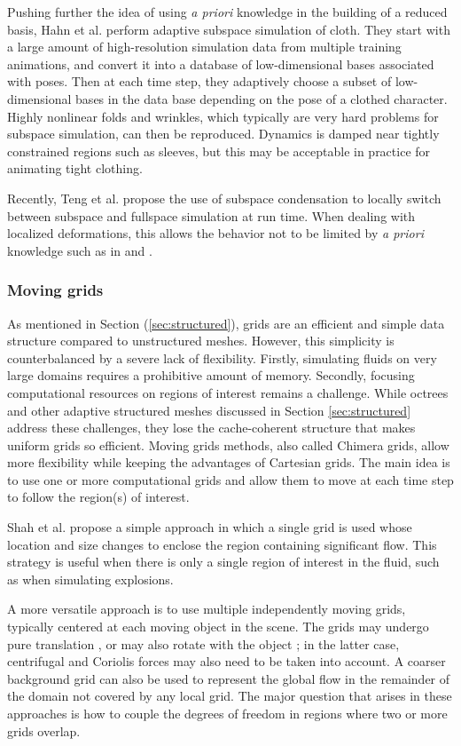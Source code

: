 Pushing further the idea of using \textit{a priori} knowledge in the building of a reduced basis, Hahn et al. \cite{Hahn2014} perform adaptive subspace simulation of cloth. They start with a large amount of high-resolution simulation data from multiple training animations, and convert it into a database of low-dimensional bases associated with poses. Then at each time step, they adaptively choose a subset of low-dimensional bases in the data base depending on the pose of a clothed character.
Highly nonlinear folds and wrinkles, which typically are very hard problems for subspace simulation, can then be reproduced. Dynamics is damped near tightly constrained regions such as sleeves, but this may be acceptable in practice for animating tight clothing.

Recently, Teng et al. \cite{Teng2015} propose the use of subspace condensation to locally switch between subspace and fullspace simulation at run time. When dealing with localized deformations, this allows the behavior not to be limited by \textit{a priori} knowledge such as in \cite{Harmon2013} and \cite{Hahn2014}.
\subsubsection{Moving grids}
\label{sec:movingMesh}

As mentioned in Section (\ref{sec:structured}), grids are an efficient and simple data structure compared to unstructured meshes. However, this simplicity is counterbalanced by a severe lack of flexibility. Firstly, simulating fluids on very large domains requires a prohibitive amount of memory. Secondly, focusing computational resources on regions of interest remains a challenge.
While octrees and other adaptive structured meshes discussed in Section \ref{sec:structured} address these challenges, they lose the cache-coherent structure that makes uniform grids so efficient.
Moving grids methods, also called Chimera grids, allow more flexibility while keeping the advantages of Cartesian grids. The main idea is to use one or more computational grids and allow them to move at each time step to follow the region(s) of interest.

Shah et al. \cite{Shah2004} propose a simple approach in which a single grid is used whose location and size changes to enclose the region containing significant flow.
This strategy is useful when there is only a single region of interest in the fluid, such as when simulating explosions.

A more versatile approach is to use multiple independently moving grids, typically centered at each moving object in the scene.
The grids may undergo pure translation \cite{Cohen2010}, or may also rotate with the object \cite{Dobashi2008,English2013}; in the latter case, centrifugal and Coriolis forces may also need to be taken into account.
A coarser background grid can also be used to represent the global flow in the remainder of the domain not covered by any local grid.
The major question that arises in these approaches is how to couple the degrees of freedom in regions where two or more grids overlap.

